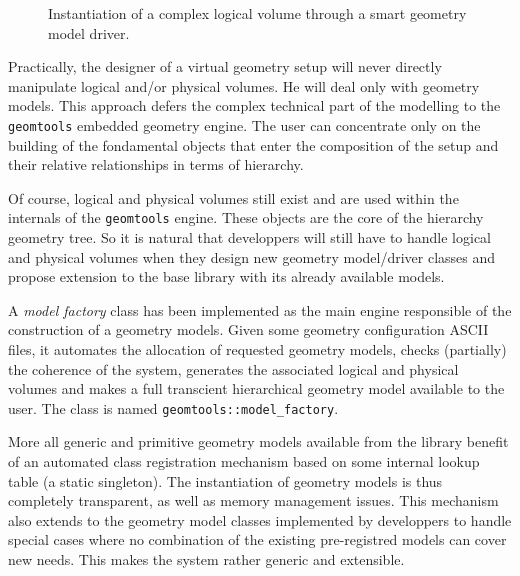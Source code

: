 \begin{figure}[h]
\begin{center}
\scalebox{0.75}{}
\end{center}
\caption{Instantiation of  a complex logical  volume through a smart
geometry model driver.}\label{fig:gm:3}
\end{figure}

Practically,  the designer  of  a virtual  geometry  setup will  never
directly manipulate logical and/or physical volumes. He will deal only
with geometry models.  This approach defers the complex technical part
of the  modelling to the \texttt{geomtools}  embedded geometry engine.
The  user can  concentrate only  on  the building  of the  fondamental
objects that  enter the  composition of the  setup and  their relative
relationships in terms of hierarchy.

Of  course, logical  and physical  volumes  still exist  and are  used
within the  internals of the \texttt{geomtools}  engine. These objects
are the  core of the hierarchy  geometry tree.  So it  is natural that
developpers  will still have  to handle  logical and  physical volumes
when  they  design  new  geometry  model/driver  classes  and  propose
extension to the base library with its already available models.

A \emph{model factory}  class has been implemented as  the main engine
responsible of  the construction of a geometry  models.  Given some
geometry configuration ASCII files, it automates the allocation of requested
geometry  models,  checks (partially)  the  coherence  of the  system,
generates the associated logical and physical volumes and makes a full
transcient hierarchical geometry model  available to the user.  The  class is named
\texttt{geomtools::model\_factory}.

More  all generic  and primitive  geometry models  available  from the
library benefit of an  automated class registration mechanism based on
some internal  lookup table (a static singleton). The  instantiation of geometry  models is
thus  completely transparent,  as  well as  memory management  issues.
This mechanism also extends  to the geometry model classes implemented
by developpers  to handle  special cases where  no combination  of the
existing pre-registred models can  cover new needs.  This makes the
system rather generic and extensible.

